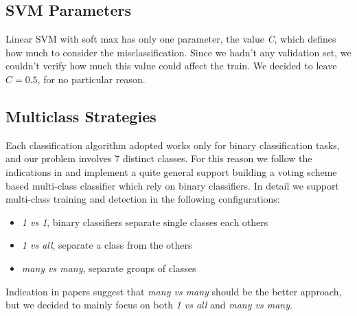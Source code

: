 \subsection{SVM Parameters}

Linear SVM with soft max has only one parameter, the value \emph{C}, which
defines how much to consider the misclassification. Since we hadn't any
validation set, we couldn't verify how much this value could affect the train.
We decided to leave $C=0.5$, for no particular reason.

\subsection{Multiclass Strategies}

Each classification algorithm adopted works only for binary classification tasks, and our problem involves 7 distinct classes. For this reason we follow the indications in \cite{Littlewort04dynamicsof, Bartlett06fullyautomatic} and implement a quite general support building a voting scheme based multi-class classifier which rely on binary classifiers. 
In detail we support multi-class training and detection in the following configurations:

\begin{itemize}
\item \emph{1 vs 1}, binary classifiers separate single classes each others
\item \emph{1 vs all}, separate a class from the others
\item \emph{many vs many}, separate groups of classes
\end{itemize}

Indication in papers suggest that \emph{many vs many} should be the better approach, but we decided to mainly focus on both \emph{1 vs all} and  \emph{many vs many}.
